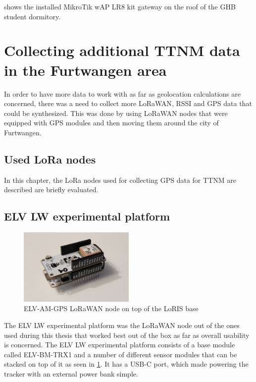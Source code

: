  shows the installed MikroTik wAP LR8 kit gateway on the roof of the \ac{GHB} student dormitory.

\section{Collecting additional \ac{TTNM} data in the Furtwangen area}

In order to have more data to work with as far as geolocation calculations are concerned, there was a need to collect more \ac{LoRaWAN}, \ac{RSSI} and \ac{GPS} data that could be synthesized.
This was done by using \ac{LoRaWAN} nodes that were equipped with \ac{GPS} modules and then moving them around the city of Furtwangen.

\subsection{Used \ac{LoRa} nodes}

In this chapter, the \ac{LoRa} nodes used for collecting \ac{GPS} data for \ac{TTNM} are described are briefly evaluated.

\subsection{ELV LW experimental platform}

\begin{figure}[h]
    \centering
    \includegraphics[width=0.5\textwidth]{pictures/hardware/gps-nodes/loris_bare.jpg}
    \caption{ELV-AM-GPS \ac{LoRaWAN} node on top of the LoRIS base~\label{pic:loris-node-bare}}
\end{figure}

The ELV LW experimental platform was the \ac{LoRaWAN} node out of the ones used during this thesis that worked best out of the box as far as overall usability is concerned\cite{elv_elektronik_ag_elv-lw-base_2023}.
The ELV LW experimental platform consists of a base module called ELV-BM-TRX1 and a number of different sensor modules that can be stacked on top of it as seen in \cref{pic:loris-node-bare}.
It has a USB-C port, which made powering the tracker with an external power bank simple.

